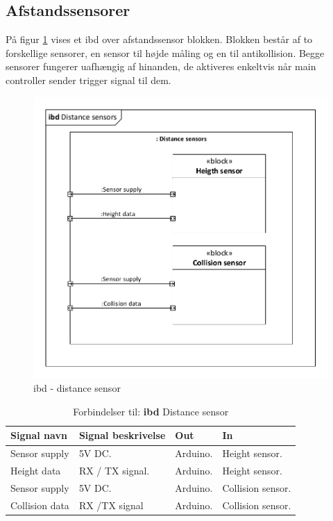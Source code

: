\subsection{Afstandssensorer}

På figur \ref{fig:ibd_distancesensor} vises et ibd over afstandssensor blokken. 
Blokken består af to forskellige sensorer, en sensor til højde måling og en til antikollision. Begge sensorer fungerer uafhængig af hinanden, de aktiveres enkeltvis når main controller sender trigger signal til dem.   

\begin{figure}[H]
\centering
\includegraphics[width=1\textwidth]{Billeder/IBD/ibd4_distancesensor.pdf}
\vspace{-1cm}
\caption{ibd - distance sensor}
\label{fig:ibd_distancesensor}
\end{figure}

\begin{table}[H]
	\centering
		\begin{tabular}{|p{2.6 cm}|p{4.9 cm}|p{2.5 cm}|p{2.5 cm}|} 
		\hline
			\textbf{Signal navn} 	& \textbf{Signal beskrivelse}		& \textbf{Out} 				& \textbf{In}     \\ \hline
			Sensor supply & 5V DC.  & Arduino. & Height sensor.  \\ \hline
			Height data & RX / TX signal. & Arduino.	& Height sensor.	\\ \hline
			Sensor supply & 5V DC. & Arduino. & Collision sensor.	\\ \hline
			Collision data & RX /TX signal & Arduino. & Collision sensor.			    \\ \hline  
		\end{tabular}
	\caption{Forbindelser til: \textbf{ibd} Distance sensor}
	\label{tab:IBDDistancesensor}
\end{table}
